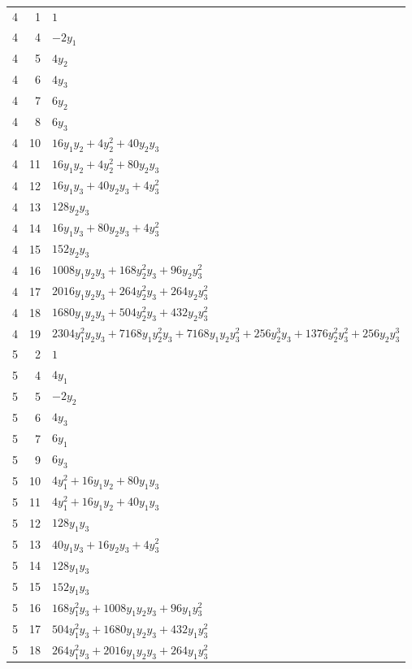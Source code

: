 \documentclass[10pt,a4paper]{article}
\begin{document}
{\begin{longtable}{rrp{125mm}}
4 & 1 & $1$\\
4 & 4 & $- 2 y_{1}$\\
4 & 5 & $4 y_{2}$\\
4 & 6 & $4 y_{3}$\\
4 & 7 & $6 y_{2}$\\
4 & 8 & $6 y_{3}$\\
4 & 10 & $16 y_{1} y_{2} + 4 y_{2}^{2} + 40 y_{2} y_{3}$\\
4 & 11 & $16 y_{1} y_{2} + 4 y_{2}^{2} + 80 y_{2} y_{3}$\\
4 & 12 & $16 y_{1} y_{3} + 40 y_{2} y_{3} + 4 y_{3}^{2}$\\
4 & 13 & $128 y_{2} y_{3}$\\
4 & 14 & $16 y_{1} y_{3} + 80 y_{2} y_{3} + 4 y_{3}^{2}$\\
4 & 15 & $152 y_{2} y_{3}$\\
4 & 16 & $1008 y_{1} y_{2} y_{3} + 168 y_{2}^{2} y_{3} + 96 y_{2} y_{3}^{2}$\\
4 & 17 & $2016 y_{1} y_{2} y_{3} + 264 y_{2}^{2} y_{3} + 264 y_{2} y_{3}^{2}$\\
4 & 18 & $1680 y_{1} y_{2} y_{3} + 504 y_{2}^{2} y_{3} + 432 y_{2} y_{3}^{2}$\\
4 & 19 & $2304 y_{1}^{2} y_{2} y_{3} + 7168 y_{1} y_{2}^{2} y_{3} + 7168 y_{1} y_{2} y_{3}^{2} + 256 y_{2}^{3} y_{3} + 1376 y_{2}^{2} y_{3}^{2} + 256 y_{2} y_{3}^{3}$\\
5 & 2 & $1$\\
5 & 4 & $4 y_{1}$\\
5 & 5 & $- 2 y_{2}$\\
5 & 6 & $4 y_{3}$\\
5 & 7 & $6 y_{1}$\\
5 & 9 & $6 y_{3}$\\
5 & 10 & $4 y_{1}^{2} + 16 y_{1} y_{2} + 80 y_{1} y_{3}$\\
5 & 11 & $4 y_{1}^{2} + 16 y_{1} y_{2} + 40 y_{1} y_{3}$\\
5 & 12 & $128 y_{1} y_{3}$\\
5 & 13 & $40 y_{1} y_{3} + 16 y_{2} y_{3} + 4 y_{3}^{2}$\\
5 & 14 & $128 y_{1} y_{3}$\\
5 & 15 & $152 y_{1} y_{3}$\\
5 & 16 & $168 y_{1}^{2} y_{3} + 1008 y_{1} y_{2} y_{3} + 96 y_{1} y_{3}^{2}$\\
5 & 17 & $504 y_{1}^{2} y_{3} + 1680 y_{1} y_{2} y_{3} + 432 y_{1} y_{3}^{2}$\\
5 & 18 & $264 y_{1}^{2} y_{3} + 2016 y_{1} y_{2} y_{3} + 264 y_{1} y_{3}^{2}$\\

\end{longtable}}
\end{document}
